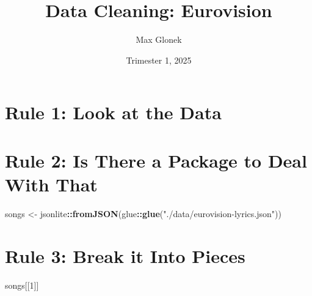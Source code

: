 \documentclass[
]{article}
\title{Data Cleaning: Eurovision}
\author{Max Glonek}
\date{Trimester 1, 2025}
\newenvironment{Shaded}{\begin{snugshade}}{\end{snugshade}}
\newcommand{\DecValTok}[1]{\textcolor[rgb]{0.00,0.00,0.81}{#1}}
\newcommand{\FunctionTok}[1]{\textcolor[rgb]{0.13,0.29,0.53}{\textbf{#1}}}
\newcommand{\NormalTok}[1]{#1}
\newcommand{\OtherTok}[1]{\textcolor[rgb]{0.56,0.35,0.01}{#1}}
\newcommand{\SpecialCharTok}[1]{\textcolor[rgb]{0.81,0.36,0.00}{\textbf{#1}}}
\newcommand{\StringTok}[1]{\textcolor[rgb]{0.31,0.60,0.02}{#1}}
\begin{document}
\maketitle

{
\setcounter{tocdepth}{2}
\tableofcontents
}
\section{Rule 1: Look at the Data}\label{rule-1-look-at-the-data}

\section{Rule 2: Is There a Package to Deal With
That}\label{rule-2-is-there-a-package-to-deal-with-that}

\begin{Shaded}
\begin{Highlighting}[]
\NormalTok{songs }\OtherTok{\textless{}{-}}\NormalTok{ jsonlite}\SpecialCharTok{::}\FunctionTok{fromJSON}\NormalTok{(glue}\SpecialCharTok{::}\FunctionTok{glue}\NormalTok{(}\StringTok{"./data/eurovision{-}lyrics.json"}\NormalTok{))}
\end{Highlighting}
\end{Shaded}

\section{Rule 3: Break it Into
Pieces}\label{rule-3-break-it-into-pieces}

\begin{Shaded}
\begin{Highlighting}[]
\NormalTok{songs[[}\DecValTok{1}\NormalTok{]]}
\end{Highlighting}
\end{Shaded}
\end{document}

